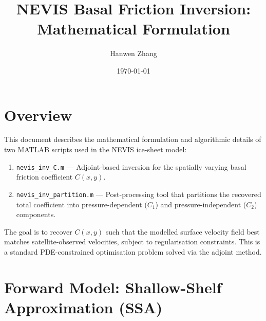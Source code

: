 \documentclass[a4paper,11pt,fleqn]{article}
\title{NEVIS Basal Friction Inversion: Mathematical Formulation}
\author{Hanwen Zhang}
\date{\today}
\begin{document}
\thispagestyle{first}

\maketitle

\tableofcontents

\section{Overview}

This document describes the mathematical formulation and algorithmic details of two MATLAB scripts used in the NEVIS ice-sheet model:
\begin{enumerate}
    \item \texttt{nevis\_inv\_C.m} --- Adjoint-based inversion for the spatially varying basal friction coefficient $C(x,y)$.
    \item \texttt{nevis\_inv\_partition.m} --- Post-processing tool that partitions the recovered total coefficient into pressure-dependent ($C_1$) and pressure-independent ($C_2$) components.
\end{enumerate}

The goal is to recover $C(x,y)$ such that the modelled surface velocity field best matches satellite-observed velocities, subject to regularisation constraints. This is a standard PDE-constrained optimisation problem solved via the adjoint method.

\section{Forward Model: Shallow-Shelf Approximation (SSA)}
\label{sec:forward}
\end{document}
